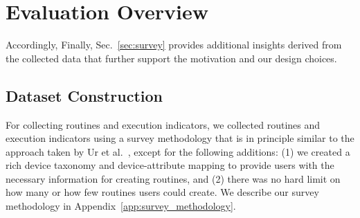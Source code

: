 \section{Evaluation Overview}
\label{sec:eval_overview}
Accordingly,
Finally, Sec.~\ref{sec:survey} provides additional insights derived from the collected data that further support the motivation and our design choices.


\subsection{Dataset Construction}
\label{sec:data_collection}
For collecting routines and execution indicators, we collected routines and execution indicators using a survey methodology that is in principle similar to the approach taken by Ur et al.~\cite{ump+14}, except for the following additions: {\sf (1)} we created a rich device taxonomy and device-attribute mapping to provide users with the necessary information for creating routines, and {\sf (2)} there was no hard limit on how many or how few routines users could create.
We describe our survey methodology in Appendix~\ref{app:survey_methodology}.

